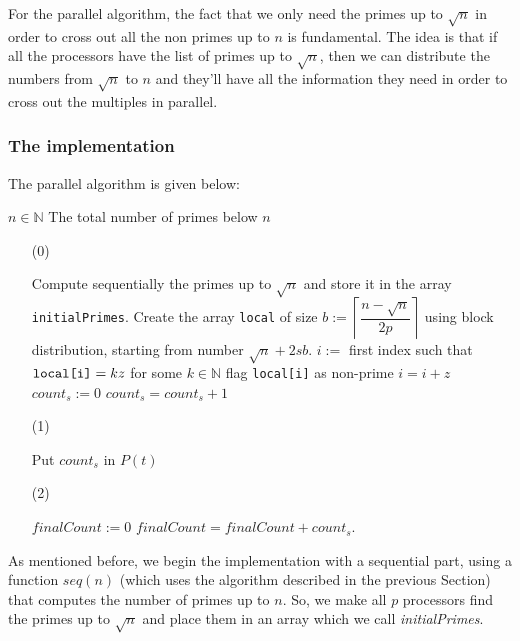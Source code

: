 \documentclass[a4paper,11pt]{article}
\newcommand{\N}{\mathbb{N}}
\begin{document}
For the parallel algorithm, the fact that we only need the primes up to $\sqrt{n}$ in order to cross out all the non primes up to $n$ is fundamental. The idea is that if all the processors have the list of primes up to $\sqrt{n}$, then we can distribute the numbers from $\sqrt{n}$ to $n$ and they'll have all the information they need in order to cross out the multiples in parallel.  

\subsubsection{The implementation}
The parallel algorithm is given below:

\begin{algorithm}[H]
\begin{algorithmic}
\REQUIRE $n \in \N$
\ENSURE The total number of primes below $n$
\end{algorithmic}

\begin{enumerate}
\item[(0)] \begin{algorithmic}
\STATE Compute sequentially the primes up to $\sqrt{n}$ and store it in the array \verb|initialPrimes|.
\STATE
\STATE Create the array \verb|local| of size $b:= \left\lceil \dfrac{n-\sqrt{n}}{2p} \right\rceil$ using block distribution, starting from number $\sqrt{n}+2sb$.
\STATE
{}
\STATE $i:=$ first index such that $\verb|local[i]|=kz$ for some $k \in \N$
\STATE flag \verb|local[i]| as non-prime
\STATE $i=i+z$
\ENDWHILE
\ENDFOR
\STATE
\STATE $count_s:=0$
\STATE $count_s=count_s+1$
\ENDIF
\ENDFOR
\end{algorithmic}
\item[(1)] \begin{algorithmic}
\STATE Put $count_s$ in $P(t)$
\ENDFOR
\end{algorithmic}
\item[(2)] \begin{algorithmic}
\STATE $finalCount:=0$
\STATE $finalCount = finalCount + count_s$.
\ENDFOR
\end{algorithmic}

\end{enumerate}
\end{algorithm}


As mentioned before, we begin the implementation with a sequential part, using a function $seq(n)$ (which uses the algorithm described in the previous Section) that computes the number of primes up to $n$. So, we make all $p$ processors find the primes up to $\sqrt{n}$ and place them in an array which we call \textit{initialPrimes}. 
\end{document}
